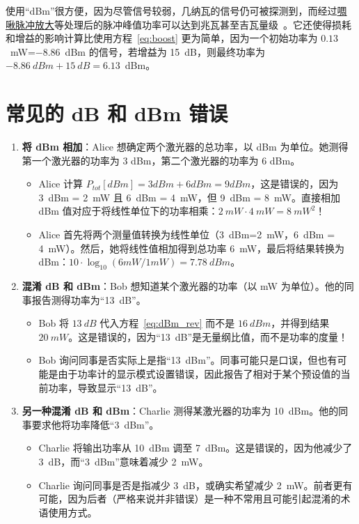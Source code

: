 使用“dBm”很方便，因为尽管信号较弱，几纳瓦的信号仍可被探测到，而经过\href{https://youtu.be/Eh5CHRWFT-M}{啁啾脉冲放大}等处理后的脉冲峰值功率可以达到兆瓦甚至吉瓦量级~\cite{Chirp_STRICKLAND_Nobel_prize}。它还使得损耗和增益的影响计算比使用方程~\ref{eq:boost} 更为简单，因为一个初始功率为 $0.13$~mW=$-8.86$~dBm 的信号，若增益为 15~dB，则最终功率为 $-8.86~dBm+15~dB=6.13$~dBm。


\section{常见的 dB 和 dBm 错误}

\begin{enumerate}
    \item \textbf{将 dBm 相加}：Alice 想确定两个激光器的总功率，以 dBm 为单位。她测得第一个激光器的功率为 3 dBm，第二个激光器的功率为 6 dBm。
    \begin{itemize}
    \item[\redcross] Alice 计算 $P_{tot} [dBm] = 3 dBm + 6 dBm = 9 dBm$，这是错误的，因为 3~dBm = 2~mW 且 6~dBm = 4~mW，但 9~dBm = 8~mW。直接相加 dBm 值对应于将线性单位下的功率相乘：$2~mW \cdot 4~mW = 8~mW^2$！
    \item[\greencheck] Alice 首先将两个测量值转换为线性单位（3~dBm=2~mW，6~dBm = 4~mW）。然后，她将线性值相加得到总功率 6~mW，最后将结果转换为 dBm：$10 \cdot \log_{10}(6mW/1mW) = 7.78~dBm$。
    \end{itemize}

    \item \textbf{混淆 dB 和 dBm}：Bob 想知道某个激光器的功率（以 mW 为单位）。他的同事报告测得功率为“13~dB”。
    \begin{itemize}
    \item[\redcross] Bob 将 $13~dB$ 代入方程~\ref{eq:dBm_rev} 而不是 $16~dBm$，并得到结果 $20~mW$。这是错误的，因为“13~dB”是无量纲比值，而不是功率的度量！
    \item[\greencheck] Bob 询问同事是否实际上是指“13~dBm”。同事可能只是口误，但也有可能是由于功率计的显示模式设置错误，因此报告了相对于某个预设值的当前功率，导致显示“13~dB”。
    \end{itemize}

   \item \textbf{另一种混淆 dB 和 dBm}：Charlie 测得某激光器的功率为 10~dBm。他的同事要求他将功率降低“3~dBm”。
    \begin{itemize}
    \item[\redcross] Charlie 将输出功率从 10~dBm 调至 7~dBm。这是错误的，因为他减少了 3~dB，而“3~dBm”意味着减少 2~mW。
    \item[\greencheck] Charlie 询问同事是否是指减少 3~dB，或确实希望减少 2~mW。前者更有可能，因为后者（严格来说并非错误）是一种不常用且可能引起混淆的术语使用方式。
    \end{itemize}
    

\end{enumerate}
